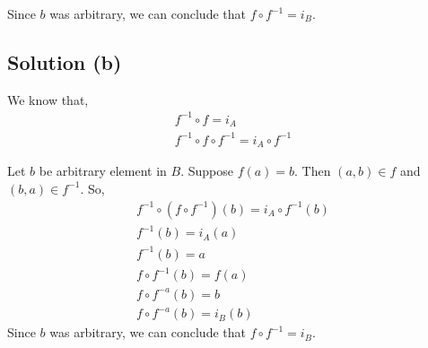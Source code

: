 \documentclass{article}
\begin{document}
Since $b$ was arbitrary, we can conclude that $f \circ f^{-1} = i_B$.

\subsection{Solution (b)}
We know that,
\begin{align*}
  f^{-1} \circ f = i_A \\
  f^{-1} \circ f \circ f^{-1} = i_A \circ f^{-1} 
\end{align*}

Let $b$ be arbitrary element in $B$. Suppose $f(a) = b$. Then $(a,b)
\in f$ and $(b,a) \in f^{-1}$. So,
\begin{align*}
  f^{-1} \circ (f \circ f^{-1})(b) = i_A \circ f^{-1}(b) \\
  f^{-1}(b) = i_A(a) \\
  f^{-1}(b) = a \\
  f \circ f^{-1}(b) = f(a) \tag{Apply f} \\
  f \circ f^{-a} (b) = b \\
  f \circ f^{-a} (b) = i_B(b)
\end{align*}
Since $b$ was arbitrary, we can conclude that $f \circ f^{-1} = i_B$.
\end{document}
